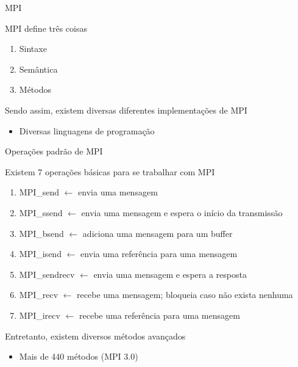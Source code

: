 \documentclass[compress]{beamer}
\begin{document}

\begin{frame}{MPI}

MPI define três coisas
\begin{enumerate}
    \item Sintaxe
    \item Semântica
    \item Métodos
\end{enumerate}

\vspace{0.5cm}

Sendo assim, existem diversas diferentes implementações de MPI
\begin{itemize}
    \item Diversas linguagens de programação
\end{itemize}
\end{frame}


\begin{frame}{Operações padrão de MPI}

Existem 7 operações básicas para se trabalhar com MPI

\begin{enumerate}
    \item MPI\_send \textcolor{sthlmDarkBlue}{$\leftarrow$} envia uma mensagem
    \item MPI\_ssend \textcolor{sthlmDarkBlue}{$\leftarrow$} envia uma mensagem e espera o início da transmissão
    \item MPI\_bsend \textcolor{sthlmDarkBlue}{$\leftarrow$} adiciona uma mensagem para um buffer
    \item MPI\_isend \textcolor{sthlmDarkBlue}{$\leftarrow$} envia uma referência para uma mensagem
    \item MPI\_sendrecv \textcolor{sthlmDarkBlue}{$\leftarrow$} envia uma mensagem e espera a resposta
    \item MPI\_recv \textcolor{sthlmDarkBlue}{$\leftarrow$} recebe uma mensagem; bloqueia caso não exista nenhuma
    \item MPI\_irecv \textcolor{sthlmDarkBlue}{$\leftarrow$} recebe uma referência para uma mensagem
\end{enumerate}

Entretanto, existem diversos métodos avançados \href{https://github.com/iagoac/dce540/blob/main/material_apoio/mpi4.0_standards.pdf}{} 
\begin{itemize}
    \item Mais de 440 métodos (MPI 3.0)
\end{itemize}
\end{frame}
\end{document}
